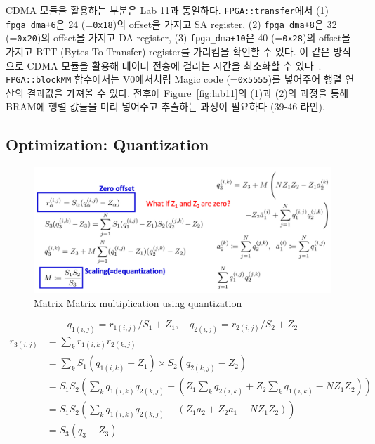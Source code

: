 \documentclass{article}
\begin{document}
CDMA 모듈을 활용하는 부분은 Lab 11과 동일하다. \texttt{FPGA::transfer}에서 (1) \texttt{fpga\_dma+6}은 24 (=\texttt{0x18})의 offset을 가지고 SA register, (2) \texttt{fpga\_dma+8}은 32 (=\texttt{0x20})의 offset을 가지고 DA register, (3) \texttt{fpga\_dma+10}은 40 (=\texttt{0x28})의 offset을 가지고 BTT (Bytes To Transfer) register를 가리킴을 확인할 수 있다. 이 같은 방식으로 CDMA 모듈을 활용해 데이터 전송에 걸리는 시간을 최소화할 수 있다~\cite{CDMA}. \\

\texttt{FPGA::blockMM} 함수에서는 V0에서처럼 Magic code (=\texttt{0x5555})를 넣어주어 행렬 연산의 결과값을 가져올 수 있다. 전후에 Figure~\ref{fig:lab11}의 (1)과 (2)의 과정을 통해 BRAM에 행렬 값들을 미리 넣어주고 추출하는 과정이 필요하다 (39-46 라인).

\newpage
\subsection{Optimization: Quantization}
\begin{figure}[htb!]
	\centering
	\includegraphics[width=1.0\textwidth]{fig/V1_Quantization/mm_mul_quant.png}
\caption{Matrix Matrix multiplication using quantization}
\label{mm_mul_quant}
\end{figure}

\begin{equation*}
    q_{1(i,j)} = r_{1(i,j)}/S_1 + Z_1, \quad
    q_{2(i,j)} = r_{2(i,j)}/S_2 + Z_2
\end{equation*}
\begin{align*}
    r_{3(i,j)} 
    &= \sum_k r_{1(i,k)} r_{2(k,j)} \\
    &= \sum_k S_1(q_{1(i,k)} - Z_1) \times S_2(q_{2(k,j)} - Z_2) \\
    &= S_1 S_2\left(\sum_k q_{1(i,k)} q_{2(k,j)} - \left( Z_1 \sum_k q_{2(i,k)} + Z_2 \sum_k q_{1(i,k)} - N Z_1 Z_2\right) \right) \\
    &= S_1 S_2\left(\sum_k q_{1(i,k)} q_{2(k,j)} - \left( Z_1 a_2 + Z_2 a_1 - N Z_1 Z_2\right) \right) \\
    &= S_3 (q_3 - Z_3)
\end{align*}
\end{document}
